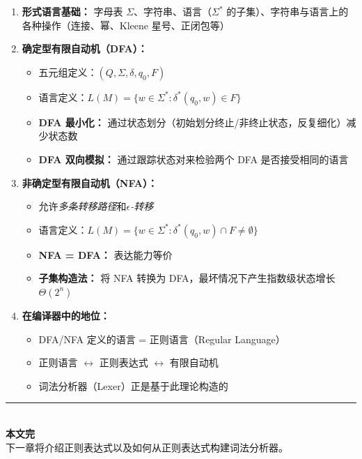 \documentclass[12pt,a4paper]{ctexart}
\begin{document}
\begin{enumerate}[itemsep=0.3em]
  \item \textbf{形式语言基础：} 字母表 $\Sigma$、字符串、语言（$\Sigma^*$ 的子集）、字符串与语言上的各种操作（连接、幂、Kleene 星号、正闭包等）

  \item \textbf{确定型有限自动机（DFA）：}
  \begin{itemize}
    \item 五元组定义：$(Q, \Sigma, \delta, q_0, F)$
    \item 语言定义：$L(M) = \{w \in \Sigma^* : \delta^*(q_0, w) \in F\}$
    \item \textbf{DFA 最小化：} 通过状态划分（初始划分终止/非终止状态，反复细化）减少状态数
    \item \textbf{DFA 双向模拟：} 通过跟踪状态对来检验两个 DFA 是否接受相同的语言
  \end{itemize}

  \item \textbf{非确定型有限自动机（NFA）：}
  \begin{itemize}
    \item 允许\emph{多条转移路径}和\emph{$\epsilon$-转移}
    \item 语言定义：$L(M) = \{w \in \Sigma^* : \delta^*(q_0, w) \cap F \neq \emptyset\}$
    \item \textbf{NFA = DFA：} 表达能力等价
    \item \textbf{子集构造法：} 将 NFA 转换为 DFA，最坏情况下产生指数级状态增长 $\Theta(2^n)$
  \end{itemize}

  \item \textbf{在编译器中的地位：}
  \begin{itemize}
    \item DFA/NFA 定义的语言 = 正则语言（Regular Language）
    \item 正则语言 $\leftrightarrow$ 正则表达式 $\leftrightarrow$ 有限自动机
    \item 词法分析器（Lexer）正是基于此理论构造的
  \end{itemize}
\end{enumerate}

\vfill
\begin{center}
\rule{0.5\textwidth}{0.3mm}\\[0.5em]
{\large\bfseries\color{mainblue} 本文完}\\[0.3em]
{\small 下一章将介绍正则表达式以及如何从正则表达式构建词法分析器。}
\end{center}
\end{document}
